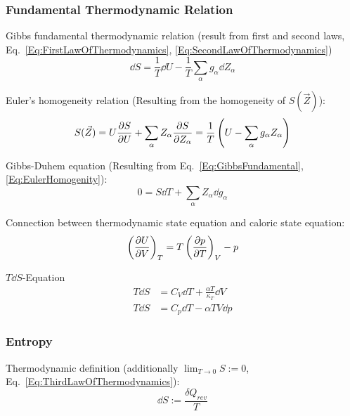		\subsubsection{Fundamental Thermodynamic Relation}
			\noindent
			Gibbs fundamental thermodynamic relation (result from first and second laws, Eq.~\ref{Eq:FirstLawOfThermodynamics}, \ref{Eq:SecondLawOfThermodynamics})
			\begin{equation}
				\label{Eq:GibbsFundamental}
				\dd S = \frac{1}{T} \dd U - \frac{1}{T} \sum_{\alpha} g_\alpha \dd Z_\alpha
			\end{equation}

			\noindent
			Euler's homogeneity relation (Resulting from the homogeneity of $S(\vec{Z})$):
			\begin{equation}
				\label{Eq:EulerHomogenity}
				S(\vec{Z}) = U\frac{\partial S}{\partial U} + \sum_\alpha Z_\alpha\frac{\partial S}{\partial Z_\alpha}
				= \frac{1}{T} \left( U-\sum_\alpha g_\alpha Z_\alpha \right)
			\end{equation}

			\noindent
			Gibbs-Duhem equation (Resulting from Eq.~\ref{Eq:GibbsFundamental}, \ref{Eq:EulerHomogenity}):
			\begin{equation}
				0 = S \dd T + \sum_\alpha Z_\alpha \dd g_\alpha
			\end{equation}

			\noindent
			Connection between thermodynamic state equation and caloric state equation:
			\begin{equation}
				\left(\frac{\partial U}{\partial V}\right)_T = T\left(\frac{\partial p}{\partial T}\right)_V - p
			\end{equation}

			\noindent
			$T \dd S$-Equation
			\begin{equation}
				\begin{aligned}
					T \dd S &= C_V \dd T + \frac{\alpha T}{\kappa_T} \dd V \\
					T \dd S &= C_p \dd T - \alpha T V \dd p
				\end{aligned}
			\end{equation}

		\subsubsection{Entropy}
			\noindent
			Thermodynamic definition (additionally $\lim_{T\rightarrow 0} S := 0$, Eq.~\ref{Eq:ThirdLawOfThermodynamics}):
			\begin{equation}
				\dd S := \frac{\delta Q_{rev}}{T}
			\end{equation}

